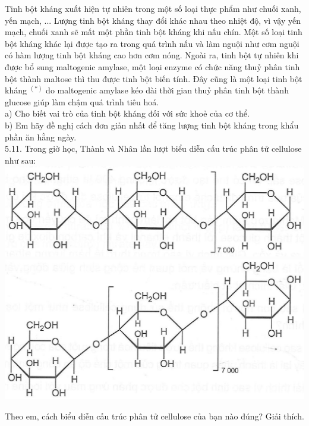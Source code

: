 \documentclass[10pt]{article}
\begin{document}
Tinh bột kháng xuất hiện tự nhiên trong một số loại thực phẩm như chuối xanh, yến mạch, ... Lượng tinh bột kháng thay đổi khác nhau theo nhiệt độ, vì vậy yến mạch, chuối xanh sẽ mất một phần tinh bột kháng khi nấu chín. Một số loại tinh bột kháng khác lại được tạo ra trong quá trình nấu và làm nguội như cơm nguội có hàm lượng tinh bột kháng cao hơn cơm nóng. Ngoài ra, tinh bột tự nhiên khi được bổ sung maltogenic amylase, một loại enzyme có chức năng thuỷ phân tinh bột thành maltose thì thu được tinh bột biến tính. Đây cũng là một loại tinh bột kháng ${ }^{(*)}$ do maltogenic amylase kéo dài thời gian thuỷ phân tinh bột thành glucose giúp làm chậm quá trình tiêu hoá.\\
a) Cho biết vai trò của tinh bột kháng đối với sức khoẻ của cơ thể.\\
b) Em hãy đề nghị cách đơn giản nhất để tăng lượng tinh bột kháng trong khẩu phần ăn hằng ngày.\\
5.11. Trong giờ học, Thành và Nhân lần lượt biểu diễn cấu trúc phân tử cellulose như sau:\\
\includegraphics[max width=\textwidth, center]{2025_10_23_de6f5713836e4e91b3c8g-033}\\
\includegraphics[max width=\textwidth, center]{2025_10_23_de6f5713836e4e91b3c8g-033(1)}

Theo em, cách biểu diễn cấu trúc phân tử cellulose của bạn nào đúng? Giải thích.
\end{document}
